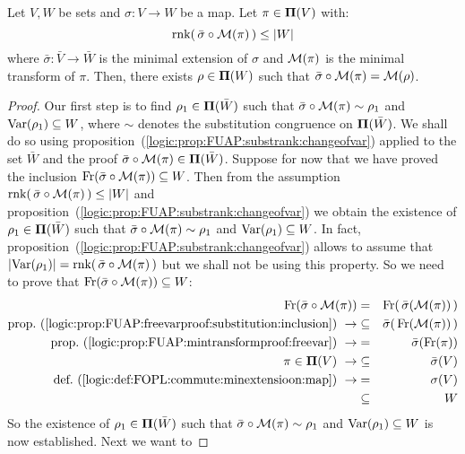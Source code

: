 \begin{theorem}\label{logic:the:FUAP:esssubst:key}
Let $V,W$ be sets and $\sigma:V\to W$ be a map. Let $\pi\in\mbox{${\bf\Pi}(V)$}$
with:
    \[
    \mbox{\rm rnk}(\,\bar{\sigma}\circ{\cal M}(\pi)\,)\leq|W|
    \]
where $\bar{\sigma}:\bar{V}\to\bar{W}$ is the minimal extension of
$\sigma$ and ${\cal M}(\pi)$ is the minimal transform of $\pi$.
Then, there exists $\rho\in{\bf\Pi}(W)$ such that
$\bar{\sigma}\circ{\cal M}(\pi)={\cal M}(\rho)$.
\end{theorem}
\begin{proof}
Our first step is to find $\rho_{1}\in{\bf\Pi}(\bar{W})$ such that
$\bar{\sigma}\circ{\cal M}(\pi)\sim\rho_{1}$ and
$\mbox{\rm Var}(\rho_{1})\subseteq W$, where $\sim$ denotes the substitution
congruence on ${\bf\Pi}(\bar{W})$. We shall do so using
proposition~(\ref{logic:prop:FUAP:substrank:changeofvar}) applied to
the set $\bar{W}$ and the proof $\bar{\sigma}\circ{\cal
M}(\pi)\in{\bf\Pi}(\bar{W})$. Suppose for now that we have proved
the inclusion $\mbox{\rm Fr}(\bar{\sigma}\circ{\cal M}(\pi))\subseteq W$.
Then from the assumption $\mbox{\rm rnk}(\,\bar{\sigma}\circ{\cal
M}(\pi)\,)\leq|W|$ and
proposition~(\ref{logic:prop:FUAP:substrank:changeofvar}) we obtain
the existence of $\rho_{1}\in{\bf\Pi}(\bar{W})$ such that
$\bar{\sigma}\circ{\cal M}(\pi)\sim\rho_{1}$ and
$\mbox{\rm Var}(\rho_{1})\subseteq W$. In fact,
proposition~(\ref{logic:prop:FUAP:substrank:changeofvar}) allows to
assume that $|\mbox{\rm Var}(\rho_{1})|=\mbox{\rm rnk}(\,\bar{\sigma}\circ{\cal
M}(\pi)\,)$ but we shall not be using this property. So we need to
prove that $\mbox{\rm Fr}(\bar{\sigma}\circ{\cal M}(\pi))\subseteq W$:
    \begin{eqnarray*}
    \free(\bar{\sigma}\circ{\cal M}(\pi))&=&\free(\,\bar{\sigma}({\cal
    M}(\pi))\,)\\
    \mbox{prop.~(\ref{logic:prop:FUAP:freevarproof:substitution:inclusion})}\ \rightarrow
    &\subseteq&\bar{\sigma}(\,\free({\cal M}(\pi))\,)\\
    \mbox{prop.~(\ref{logic:prop:FUAP:mintransformproof:freevar})}\ \rightarrow
    &=&\bar{\sigma}(\free(\pi))\\
    \pi\in\pvs\ \rightarrow&\subseteq&\bar{\sigma}(V)\\
    \mbox{def.~(\ref{logic:def:FOPL:commute:minextensioon:map})}\ \rightarrow
    &=&\sigma(V)\\
    &\subseteq&W
    \end{eqnarray*}
So the existence of $\rho_{1}\in{\bf\Pi}(\bar{W})$ such that
$\bar{\sigma}\circ{\cal M}(\pi)\sim\rho_{1}$ and
$\mbox{\rm Var}(\rho_{1})\subseteq W$ is now established. Next we want to

\end{proof}
